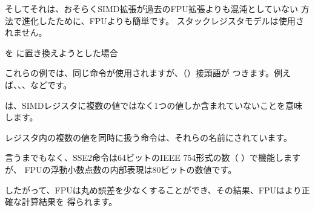 そしてそれは、おそらくSIMD拡張が過去のFPU拡張よりも混沌としていない
方法で進化したために、FPUよりも簡単です。
スタックレジスタモデルは使用されません。

\Tdouble を \Tfloat に置き換えようとした場合

これらの例では、同じ命令が使用されますが、（）接頭語が
つきます。例えば、、、などです。

は、SIMDレジスタに複数の値ではなく1つの値しか含まれていないことを意味します。

レジスタ内の複数の値を同時に扱う命令は、それらの名前にされています。

言うまでもなく、SSE2命令は64ビットのIEEE 754形式の数（ \Tdouble ）で機能しますが、
FPUの浮動小数点数の内部表現は80ビットの数値です。

したがって、FPUは丸め誤差を少なくすることができ、その結果、FPUはより正確な計算結果を
得られます。
